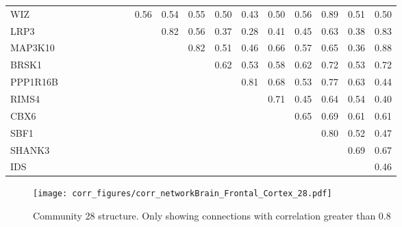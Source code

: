 \begin{longtable}{lrrrrrrrrrrrrrrrrr}
WIZ      &              &            &            &           &              &            &           &       0.56 &          0.54 &        0.55 &           0.50 &        0.43 &       0.50 &       0.56 &         0.89 &      0.51 &        0.50 \\
LRP3     &              &            &            &           &              &            &           &            &          0.82 &        0.56 &           0.37 &        0.28 &       0.41 &       0.45 &         0.63 &      0.38 &        0.83 \\
MAP3K10  &              &            &            &           &              &            &           &            &               &        0.82 &           0.51 &        0.46 &       0.66 &       0.57 &         0.65 &      0.36 &        0.88 \\
BRSK1    &              &            &            &           &              &            &           &            &               &             &           0.62 &        0.53 &       0.58 &       0.62 &         0.72 &      0.53 &        0.72 \\
PPP1R16B &              &            &            &           &              &            &           &            &               &             &                &        0.81 &       0.68 &       0.53 &         0.77 &      0.63 &        0.44 \\
RIMS4    &              &            &            &           &              &            &           &            &               &             &                &             &       0.71 &       0.45 &         0.64 &      0.54 &        0.40 \\
CBX6     &              &            &            &           &              &            &           &            &               &             &                &             &            &       0.65 &         0.69 &      0.61 &        0.61 \\
SBF1     &              &            &            &           &              &            &           &            &               &             &                &             &            &            &         0.80 &      0.52 &        0.47 \\
SHANK3   &              &            &            &           &              &            &           &            &               &             &                &             &            &            &              &      0.69 &        0.67 \\
IDS      &              &            &            &           &              &            &           &            &               &             &                &             &            &            &              &           &        0.46 \\
\end{longtable}


\begin{figure}[h!]
\centering
\texttt{[image: corr\_figures/corr\_networkBrain\_Frontal\_Cortex\_28.pdf]}
\caption{Community 28 structure. Only showing connections with correlation greater than 0.8}
\end{figure}


